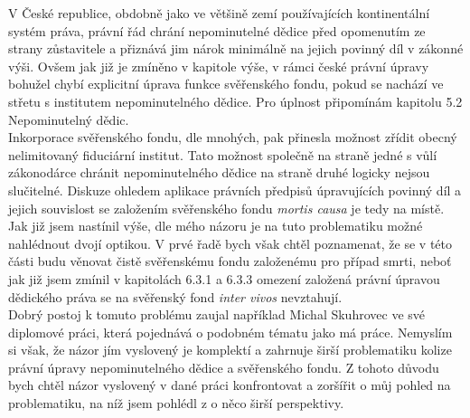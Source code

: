 \documentclass{article}
\begin{document}
V České republice, obdobně jako ve většině zemí používajících kontinentální systém práva, právní řád chrání nepominutelné dědice před opomenutím ze strany zůstavitele a přiznává jim nárok minimálně na jejich povinný díl v zákonné výši. Ovšem jak již je zmíněno v kapitole výše, v rámci české právní úpravy bohužel chybí explicitní úprava funkce svěřenského fondu, pokud se nachází ve střetu s institutem nepominutelného dědice. Pro úplnost připomínám kapitolu 5.2 Nepominutelný dědic.\\

Inkorporace svěřenského fondu, dle mnohých, pak přinesla možnost zřídit obecný nelimitovaný fiduciární institut. Tato možnost společně na straně jedné s vůlí zákonodárce chránit nepominutelného dědice na straně druhé logicky nejsou slučitelné. Diskuze ohledem aplikace právních předpisů úpravujících povinný díl a jejich souvislost se založením svěřenského fondu \textit{mortis causa} je tedy na místě.\\

Jak již jsem nastínil výše, dle mého názoru je na tuto problematiku možné nahlédnout dvojí optikou. V prvé řadě bych však chtěl poznamenat, že se v této části budu věnovat čistě svěřenskému fondu založenému pro případ smrti, neboť jak již jsem zmínil v kapitolách 6.3.1 a 6.3.3 omezení založená právní úpravou dědického práva se na svěřenský fond \textit{inter vivos} nevztahují.\\

Dobrý postoj k tomuto problému zaujal například Michal Skuhrovec ve své diplomové práci, která pojednává o podobném tématu jako má práce. Nemyslím si však, že názor jím vyslovený je komplektí a zahrnuje širší problematiku kolize právní úpravy nepominutelného dědice a svěřenského fondu. Z tohoto důvodu bych chtěl názor vyslovený v dané práci konfrontovat a zoršířit o můj pohled na problematiku, na níž jsem pohlédl z o něco širší perspektivy.\\
\end{document}
